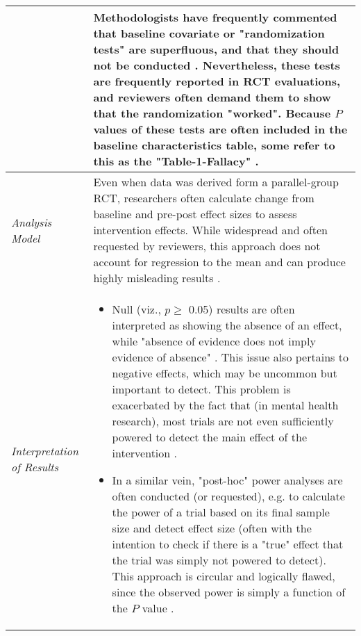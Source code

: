 \begin{table}[!htbp]
\begin{tabular}{  p{3cm}  p{11cm} }
& \vspace{1mm} Methodologists have frequently commented that baseline covariate or "randomization tests" are superfluous, and that they should not be conducted \citep{moher2012consort, senn1994testing, altman1990randomisation, begg1990significance, de2015testing}. \newline \newline Nevertheless, these tests are frequently reported in RCT evaluations, and reviewers often demand them to show that the randomization "worked". Because $P$ values of these tests are often included in the baseline characteristics table, some refer to this as the "Table-1-Fallacy" \citep{pijls2022table}.  \vspace{2.5mm}
\\\hline
\vspace{1mm} \emph{Analysis Model}        
& \vspace{1mm} Even when data was derived form a parallel-group RCT, researchers often calculate change from baseline and pre-post effect sizes to assess intervention effects. While widespread and often requested by reviewers, this approach does not account for regression to the mean and can produce highly misleading results \citep{cuijpers2017pre, bland2011comparisons, bland2015best}.
\vspace{2.5mm} \\\hline

\vspace{1mm}
\emph{Interpretation of \newline Results}        

& 

\begin{itemize}
    \item Null (viz., $p\geq$ 0.05) results are often interpreted as showing the absence of an effect, while "absence of evidence does not imply evidence of absence" \citep{altman1995statistics, alderson2004absence}. This issue also pertains to negative effects, which may be uncommon but important to detect. This problem is exacerbated by the fact that (in mental health research), most trials are not even sufficiently powered to detect the main effect of the intervention \citep{de2022statistical}.
    \item In a similar vein, "post-hoc" power analyses are often conducted (or requested), e.g. to calculate the power of a trial based on its final sample size and detect effect size (often with the intention to check if there is a "true" effect that the trial was simply not powered to detect). This approach is circular and logically flawed, since the observed power is simply a function of the $P$ value \citep{hoenig2001abuse, althouse2021post}.
\end{itemize} \vspace{1mm} \\

    \end{tabular}
\end{table}

